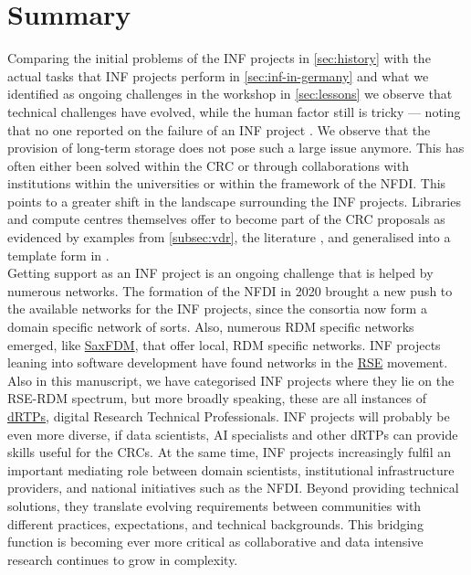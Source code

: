 \documentclass{eceasst}
\begin{document}
\section{Summary}
Comparing the initial problems of the INF projects in \autoref{sec:history}
with the actual tasks that INF projects perform in \autoref{sec:inf-in-germany}
and what we identified as ongoing challenges in the workshop in \autoref{sec:lessons}
we observe that technical challenges have evolved, while the human factor still is tricky ---  noting that no one reported on
the failure of an INF project \cite{Dierkes2020}.
We observe that the provision of long-term storage does not pose such a large issue anymore.
This has often either been solved within the CRC or through collaborations with institutions within the universities or within the framework of the NFDI.
This points to a greater shift in the landscape surrounding the INF projects.
Libraries and compute centres themselves offer to become part of the CRC proposals as evidenced by examples from \autoref{subsec:vdr}, the literature \cite{Hausen_Rosenberg_Trautwein-Bruns_Schwarz_2020},
and generalised into a template form in \cite{Kempf2026}.\\
Getting support as an INF project is an ongoing challenge that is helped by numerous networks.
The formation of the NFDI in 2020 brought a new push to the available networks for the INF projects, since
the consortia now form a domain specific network of sorts.
Also, numerous RDM specific networks emerged, like \href{https://saxfdm.de/}{SaxFDM}, that offer local, RDM specific networks.
INF projects leaning into software development have found networks in the \href{https://de-rse.org/}{RSE} movement.\\
Also in this manuscript, we have categorised INF projects where they lie on the RSE-RDM spectrum, but more broadly speaking,
these are all instances of \href{https://drtp-skills.ac.uk/}{dRTPs}, digital Research Technical Professionals.
INF projects will probably be even more diverse, if data scientists, AI specialists and other dRTPs can provide skills useful for the CRCs.
At the same time, INF projects increasingly fulfil an important mediating role between domain scientists, 
institutional infrastructure providers, and national initiatives such as the NFDI. Beyond providing technical solutions, 
they translate evolving requirements between communities with different practices, expectations, and technical backgrounds. 
This bridging function is becoming ever more critical as collaborative and data intensive research continues to grow in complexity.
\end{document}
